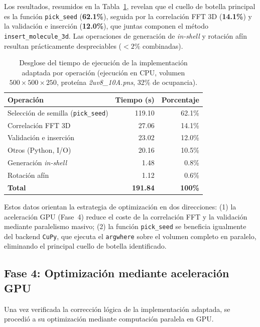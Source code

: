 \begin{enumerate}
    Los resultados, resumidos en la Tabla~\ref{tab:profile}, revelan que el cuello de botella principal es la función \texttt{pick\_seed} (\textbf{62.1\%}), seguida por la correlación FFT 3D (\textbf{14.1\%}) y la validación e inserción (\textbf{12.0\%}), que juntas componen el método \texttt{insert\_molecule\_3d}. Las operaciones de generación de \textit{in-shell} y rotación afín resultan prácticamente despreciables ($<2\%$ combinadas).

    \begin{table}[H]
    \centering
    \begin{tabular}{|l|r|r|}
    \hline
    \textbf{Operación} & \textbf{Tiempo (s)} & \textbf{Porcentaje} \\
    \hline
    Selección de semilla (\texttt{pick\_seed}) & 119.10 & 62.1\% \\
    Correlación FFT 3D & 27.06 & 14.1\% \\
    Validación e inserción & 23.02 & 12.0\% \\
    Otros (Python, I/O) & 20.16 & 10.5\% \\
    Generación \textit{in-shell} & 1.48 & 0.8\% \\
    Rotación afín & 1.12 & 0.6\% \\
    \hline
    \textbf{Total} & \textbf{191.84} & \textbf{100\%} \\
    \hline
    \end{tabular}
    \caption{Desglose del tiempo de ejecución de la implementación adaptada por operación (ejecución en CPU, volumen $500\times500\times250$, proteína \textit{2uv8\_10A.pns}, 32\% de ocupancia).}
    \label{tab:profile}
    \end{table}

    Estos datos orientan la estrategia de optimización en dos direcciones: (1) la aceleración GPU (Fase~4) reduce el coste de la correlación FFT y la validación mediante paralelismo masivo; (2) la función \texttt{pick\_seed} se beneficia igualmente del backend \texttt{CuPy}, que ejecuta el \texttt{argwhere} sobre el volumen completo en paralelo, eliminando el principal cuello de botella identificado.
\end{enumerate}

\subsection{Fase 4: Optimización mediante aceleración GPU}

Una vez verificada la corrección lógica de la implementación adaptada, se procedió a su optimización mediante computación paralela en GPU.

